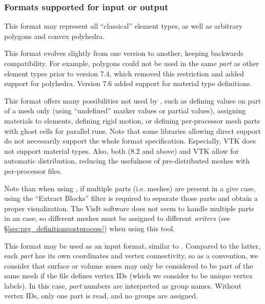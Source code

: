 {{{%
\subsubsection{Formats supported for input or output\label{sec:formats_inout}}

\subsubsubsection{\ensightg%
\label{sec:fmtdesc_ensightg}}

This format may represent all ``classical'' element types, as well as
arbitrary polygons and convex polyhedra.

This format evolves slightly from one \ensight version to another, keeping
backwards compatibility. For example, polygons could not be used in the
same \emph{part} as other element types prior to version 7.4, which removed
this restriction and added support for polyhedra. Version 7.6 added support
for material type definitions.

This format offers many possibilities not used by \CS, such as defining
values on part of a mesh only (using ``undefined'' marker values or
partial values), assigning materials to elements, defining rigid
motion, or defining per-processor mesh parts with ghost cells for
parallel runs. Note that some libraries allowing direct \ensightg support
do not necessarily support the whole format specification.
Especially, VTK does not support material types.
Also, both \ensightg (8.2 and above) and VTK allow for automatic distribution,
reducing the usefulness of pre-distributed meshes with per-processor files.

Note than when using \paraview, if multiple parts (i.e. meshes) are
present in a give case, using the ``Extract Blocks'' filter is
required to separate those parts and obtain a proper visualization.
The VisIt software does not seem to handle multiple parts in an \ensight case,
so different meshes must be assigned to different
\emph{writers} (see \S\ref{sec:prg_definitionpostprocess}) when using this tool.

This format may be used as an input format, similar to .
Compared to the latter, each \emph{part} has its own coordinates and vertex
connectivity, so as a convention, we consider that surface or
volume zones may only be considered to be part of the same mesh
if the file defines vertex IDs (which we consider to be
unique vertex labels). In this case, \emph{part} numbers
are interpreted as group names. Without vertex IDs, only one part is read,
and no groups are assigned.

}}}
